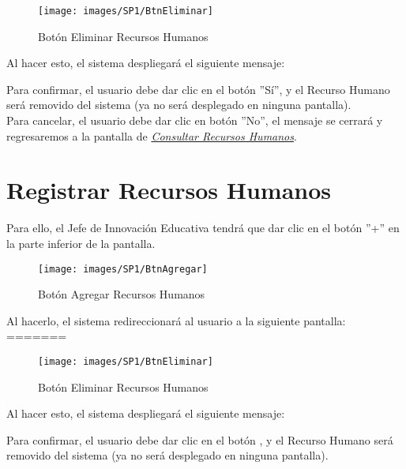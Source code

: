             \begin{figure}[!hbtp]
                \centering
                \hypertarget{eliminar}{\texttt{[image: images/SP1/BtnEliminar]}}
                \caption{Botón Eliminar Recursos Humanos}
                \label{eliminar}
            \end{figure}

            Al hacer esto, el sistema despliegará el siguiente mensaje:

            Para confirmar, el usuario debe dar clic en el botón ''Sí'', y el Recurso Humano será removido del sistema (ya no será desplegado en ninguna pantalla).\\

            Para cancelar, el usuario debe dar clic en botón ''No'', el mensaje se cerrará y regresaremos a la pantalla de \hyperlink{consultarrh}{\textit{Consultar Recursos Humanos}}.\\

        \section{Registrar Recursos Humanos}

            Para ello, el Jefe de Innovación Educativa tendrá que dar clic en el botón ''+'' en la parte inferior de la pantalla.

            \begin{figure}[!hbtp]
                \centering
                \hypertarget{add}{\texttt{[image: images/SP1/BtnAgregar]}}
                \caption{Botón Agregar Recursos Humanos}
                \label{add}
            \end{figure}

            Al hacerlo, el sistema redireccionará al usuario a la siguiente pantalla:
=======
        	\begin{figure}[!hbtp]
        		\centering
        		\hypertarget{eliminar}{\texttt{[image: images/SP1/BtnEliminar]}}
        		\caption{Botón Eliminar Recursos Humanos}
        		\label{eliminar}
        	\end{figure}
        
        	Al hacer esto, el sistema despliegará el siguiente mensaje:
        
        	Para confirmar, el usuario debe dar clic en el botón , y el Recurso Humano será removido del sistema (ya no será desplegado en ninguna pantalla).\\
        
